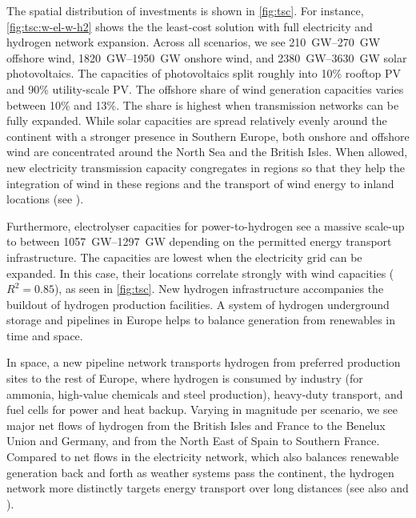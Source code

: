 The spatial distribution of investments is shown in \cref{fig:tsc}. For
instance, \cref{fig:tsc:w-el-w-h2} shows the the least-cost solution with full
electricity and hydrogen network expansion. Across all scenarios, we see
\SIrange{210}{270}{\giga\watt} offshore wind, \SIrange{1820}{1950}{\giga\watt}
onshore wind, and \SIrange{2380}{3630}{\giga\watt} solar photovoltaics. The
capacities of photovoltaics split roughly into 10\% rooftop PV and 90\%
utility-scale PV. The offshore share of wind generation capacities varies
between 10\% and 13\%. The share is highest when transmission networks can be
fully expanded. While solar capacities are spread relatively evenly around the
continent with a stronger presence in Southern Europe, both onshore and offshore
wind are concentrated around the North Sea and the British Isles. When allowed,
new electricity transmission capacity congregates in regions so that they help
the integration of wind in these regions and the transport of wind energy to
inland locations (see ).


Furthermore, electrolyser capacities for power-to-hydrogen see a massive
scale-up to between \SIrange{1057}{1297}{\giga\watt} depending on the permitted
energy transport infrastructure. The capacities are lowest when the electricity
grid can be expanded. In this case, their locations correlate strongly with wind
capacities ($R^2=0.85$), as seen in \cref{fig:tsc}. New hydrogen infrastructure
accompanies the buildout of hydrogen production facilities. A system of hydrogen
underground storage and pipelines in Europe helps to balance generation from
renewables in time and space.


In space, a new pipeline network transports hydrogen from preferred production
sites to the rest of Europe, where hydrogen is consumed by industry (for
ammonia, high-value chemicals and steel production), heavy-duty transport, and
fuel cells for power and heat backup. Varying in magnitude per scenario, we see
major net flows of hydrogen from the British Isles and France to the Benelux Union and
Germany, and from the North East of Spain to Southern France.
Compared to net flows in the electricity network, which also balances renewable
generation back and forth as weather systems pass the continent, the hydrogen
network more distinctly targets energy transport over long distances (see also
 and ).

